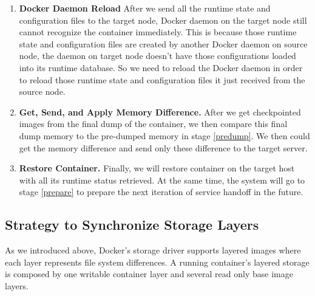 \begin{enumerate}[label=\textbf{S\arabic*}]
\item \label{daemon-Reload} \textbf{Docker Daemon Reload} After we send all the runtime state and configuration files to the target node, Docker daemon on the target node still cannot recognize the container immediately.  This is because those runtime state and configuration files are created by another Docker daemon on source node, the daemon on target node doesn't have those configurations loaded into its runtime database. So we need to reload the Docker daemon in order to reload those runtime state and configuration files it just received from the source node.

\item \label{img-sync} \textbf{Get, Send, and Apply Memory Difference.} After we get checkpointed images from the final dump of the container, we then compare this final dump memory to the pre-dumped memory in stage \ref{predump}. We then could get the memory difference and send only these difference to the target server. 

\item \label{restore} \textbf{Restore Container.} Finally, we will restore container on the target host with all its runtime status retrieved. At the same time, the system will go to stage \ref{prepare} to prepare the next iteration of service handoff in the future.

\end{enumerate}



% 
% 

\subsection{Strategy to Synchronize Storage Layers} \label{design:mapImage}

As we introduced above, Docker's storage driver supports layered images where each layer represents file system differences. A running container's layered storage is composed by one writable container layer and several read only base image layers. 

